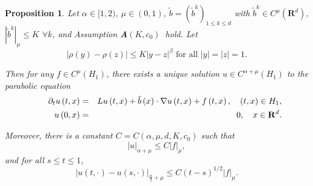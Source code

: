 \documentclass[11pt]{amsart}
\theoremstyle{plain}
\newtheorem{proposition}{Proposition}
\numberwithin{equation}{section}
\begin{document}
\begin{proposition}
\label{p1}Let $\alpha \in \lbrack 1,2)$, $\mu \in (0,1)$, $\tilde{b}=\left( 
\tilde{b}^{k}\right) _{1\leq k\leq d}$ with $\tilde{b}^{k}\in C^{\mu }\left( 
\mathbf{R}^{d}\right) $, $\left\vert \tilde{b}^{k}\right\vert _{\mu }\leq K$ 
$\forall k$, and Assumption \textbf{A}$(K,c_{0})$\textbf{\ }hold. Let 
\begin{equation*}
\left\vert \rho \left( y\right) -\rho \left( z\right) \right\vert \leq
K\left\vert y-z\right\vert ^{\beta }\text{ for all }\left\vert y\right\vert
=\left\vert z\right\vert =1.
\end{equation*}

Then for any $f\in C^{\mu }\left( H_{1}\right) $, there exists a unique
solution $u\in C^{\alpha +\mu }\left( H_{1}\right) $ to the parabolic
equation 
\begin{eqnarray}
\qquad \partial _{t}u\left( t,x\right) &=&Lu\left( t,x\right) +\tilde{b}\left( x\right) \cdot \nabla u\left( t,x\right) +f\left( t,x\right) ,\quad
\left( t,x\right) \in H_{1},  \label{e1} \\
u\left( 0,x\right) &=&0,\quad x\in \mathbf{R}^{d}.  \notag
\end{eqnarray}

Moreover, there is a constant $C=C\left( \alpha ,\mu ,d,K,c_{0}\right) $
such that 
\begin{equation*}
\left\vert u\right\vert _{\alpha +\mu }\leq C\left\vert f\right\vert _{\mu },
\end{equation*}and for all $s\leq t\leq 1$, 
\begin{equation*}
\left\vert u\left( t,\cdot \right) -u\left( s,\cdot \right) \right\vert _{\frac{\alpha }{2}+\mu }\leq C\left( t-s\right) ^{1/2}\left\vert f\right\vert
_{\mu }.
\end{equation*}
\end{proposition}
\end{document}
